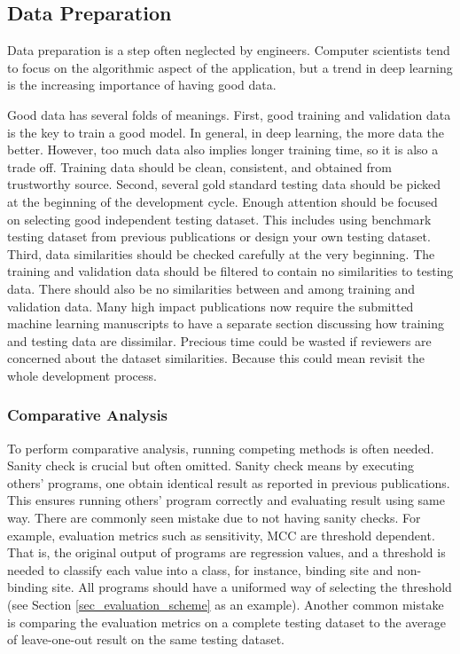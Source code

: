 \subsection{Data Preparation}
Data preparation is a step often neglected by engineers. Computer scientists tend to focus on the algorithmic aspect of the application, but a trend in deep learning is the increasing importance of having good data. 

Good data has several folds of meanings. First, good training and validation data is the key to train a good model. In general, in deep learning, the more data the better. However, too much data also implies longer training time, so it is also a trade off. Training data should be clean, consistent, and obtained from trustworthy source. Second, several gold standard testing data should be picked at the beginning of the development cycle. Enough attention should be focused on selecting good independent testing dataset. This includes using benchmark testing dataset from previous publications or design your own testing dataset.  Third, data similarities should be checked carefully at the very beginning. The training and validation data should be filtered to contain no similarities to testing data. There should also be no similarities between and among training and validation data. Many high impact publications now require the submitted machine learning manuscripts to have a separate section discussing how training and testing data are dissimilar. Precious time could be wasted if reviewers are concerned about the dataset similarities. Because this could mean revisit the whole development process.

\subsubsection{Comparative Analysis}
To perform comparative analysis, running competing methods is often needed. Sanity check is crucial but often omitted. Sanity check means by executing others' programs, one obtain identical result as reported in previous publications. This ensures running others' program correctly and evaluating result using same way. There are commonly seen mistake due to not having sanity checks. For example, evaluation metrics such as sensitivity, MCC are threshold dependent. That is, the original output of programs are regression values, and a threshold is needed to classify each value into a class, for instance, binding site and non-binding site. All programs should have a uniformed way of selecting the threshold (see Section \ref{sec_evaluation_scheme} as an example). Another common mistake is comparing the evaluation metrics on a complete testing dataset to the average of leave-one-out result on the same testing dataset.


